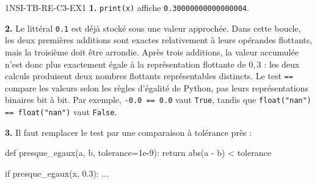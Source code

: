 \begin{corrige}{1NSI-TB-RE-C3-EX1}
\textbf{1.} \lstinline{print(x)} affiche \lstinline{0.30000000000000004}.

\textbf{2.} Le littéral \lstinline{0.1} est déjà stocké sous une valeur approchée. Dans cette
boucle, les deux premières additions sont exactes relativement à leurs opérandes flottants,
mais la troisième doit être arrondie. Après trois additions, la valeur accumulée n'est donc
plus exactement égale à la représentation flottante de $0{,}3$ : les deux calculs produisent
deux nombres flottants représentables distincts. Le test \lstinline{==} compare les valeurs
selon les règles d'égalité de Python, pas leurs représentations binaires bit à bit. Par
exemple, \lstinline{-0.0 == 0.0} vaut \lstinline{True}, tandis que
\lstinline{float("nan") == float("nan")} vaut \lstinline{False}.

\textbf{3.} Il faut remplacer le test par une comparaison à tolérance près :
\begin{python}
def presque_egaux(a, b, tolerance=1e-9):
    return abs(a - b) < tolerance

if presque_egaux(x, 0.3):
    ...
\end{python}
\end{corrige}
